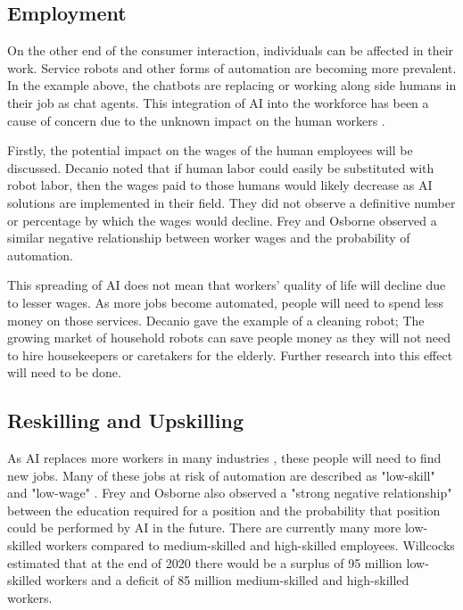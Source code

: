 \documentclass[12pt, man]{apa6}
\begin{document}
\subsection*{Employment}
On the other end of the consumer interaction, individuals can be affected in their work.  Service robots and other forms of automation are becoming more prevalent. In the example above, the chatbots are replacing or working along side humans in their job as chat agents.  This integration of AI into the workforce has been a cause of concern due to the unknown impact on the human workers \parencite{DeCanio2016280}.

Firstly, the potential impact on the wages of the human employees will be discussed.  Decanio \parencite*[]{DeCanio2016280} noted that if human labor could easily be substituted with robot labor, then the wages paid to those humans would likely decrease as AI solutions are implemented in their field.  They did not observe a definitive number or percentage by which the wages would decline.  Frey and Osborne \parencite*[]{Frey2017} observed a similar negative relationship between worker wages and the probability of automation.

This spreading of AI does not mean that workers' quality of life will decline due to lesser wages.  As more jobs become automated, people will need to spend less money on those services.  Decanio \parencite*[]{DeCanio2016280} gave the example of a cleaning robot; The growing market of household robots can save people money as they will not need to hire housekeepers or caretakers for the elderly.  Further research into this effect will need to be done.

\subsection*{Reskilling and Upskilling}
As AI replaces more workers in many industries \parencite{Nguyen2022}, these people will need to find new jobs.  Many of these jobs at risk of automation are described as "low-skill" and "low-wage" \parencite[]{Frey2017}.  Frey and Osborne \parencite*[]{Frey2017} also observed a "strong negative relationship" between the education required for a position and the probability that position could be performed by AI in the future.
There are currently many more low-skilled workers compared to medium-skilled and high-skilled employees.  Willcocks \parencite*[]{Willcocks2020} estimated that at the end of 2020 there would be a surplus of 95 million low-skilled workers and a deficit of 85 million medium-skilled and high-skilled workers.
\end{document}
